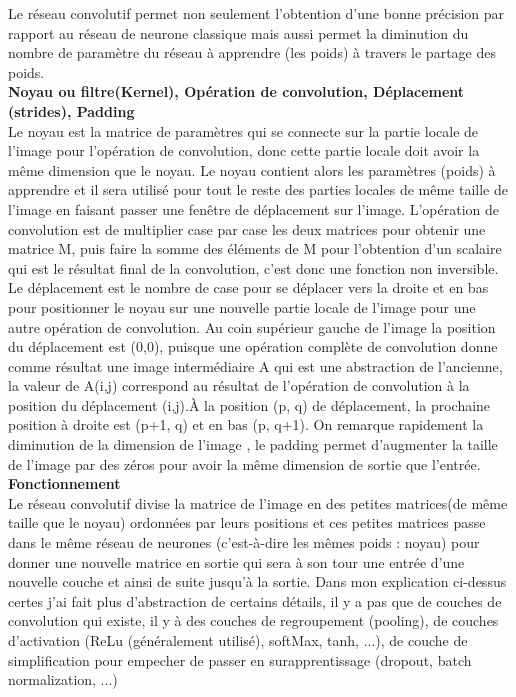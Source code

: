 Le réseau convolutif permet non seulement l'obtention d'une bonne précision par rapport au réseau de neurone classique mais aussi permet la diminution du nombre de paramètre du réseau à apprendre (les poids) à travers le partage des poids.\\

\textbf{Noyau ou filtre(Kernel), Opération de convolution, Déplacement (strides),  Padding } \\%
Le noyau est la matrice de paramètres qui se connecte sur la partie locale de l'image pour l'opération de convolution, donc cette partie locale doit avoir la même dimension que le noyau. Le noyau contient alors les paramètres (poids) à apprendre et il sera utilisé pour tout le reste des parties locales de même taille de l'image en faisant passer une fenêtre de déplacement sur l'image. L'opération de convolution est de multiplier case par case les deux matrices pour obtenir une matrice M, puis faire la somme des éléments de M pour l'obtention d'un scalaire qui est le résultat final de la convolution, c'est donc une fonction non inversible. Le déplacement est le nombre de case pour se déplacer vers la droite et en bas pour positionner le noyau sur une nouvelle partie locale de l'image pour une autre opération de convolution. Au coin supérieur gauche de l'image la position du  déplacement est (0,0), puisque une opération complète de convolution donne comme résultat une image intermédiaire A qui est une abstraction de l'ancienne, la valeur de A(i,j) correspond au résultat de l'opération de convolution à la position du déplacement (i,j).À la position (p, q) de déplacement, la prochaine position à droite est (p+1, q) et en bas (p, q+1). On remarque rapidement la diminution de la dimension de l'image , le padding permet d'augmenter la taille de l'image par des zéros pour avoir la même dimension de sortie que l'entrée.\\


\textbf{Fonctionnement}\\
Le réseau convolutif divise la matrice de l'image en des petites matrices(de même taille que le noyau) ordonnées par leurs positions et ces petites matrices passe dans le même réseau de neurones (c'est-à-dire les mêmes poids : noyau) pour donner une nouvelle matrice en sortie qui sera à son tour une entrée d'une nouvelle couche et ainsi de suite jusqu'à la sortie. Dans mon explication ci-dessus certes j'ai fait plus d'abstraction de certains détails, il y a pas que de couches de convolution qui existe, il y à des couches de regroupement (pooling), de couches d'activation (ReLu (généralement utilisé), softMax, tanh, ...), de couche de simplification pour empecher de passer en surapprentissage (dropout, batch normalization, ...) \cite{adavencedCNN}

